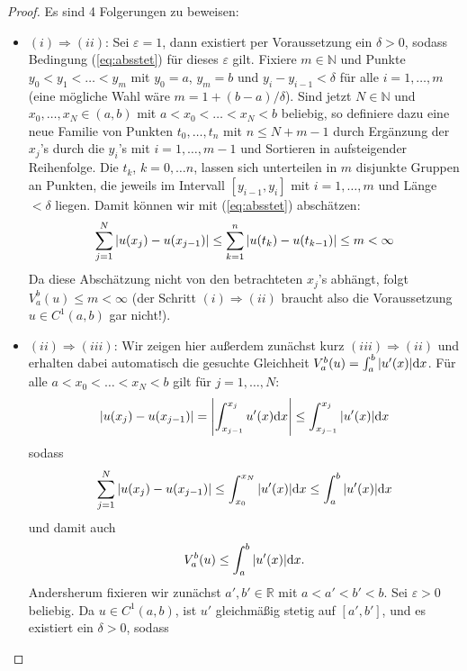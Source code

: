 \documentclass[twoside]{article}
\theoremstyle{definition}
\newcommand{\R}{\mathbb{R}}
\newcommand{\N}{\mathbb{N}}
\begin{document}
\begin{proof} Es sind 4 Folgerungen zu beweisen:
\begin{itemize}
\item $(i) \Rightarrow (ii)$: Sei $\varepsilon = 1$, dann existiert per Voraussetzung ein $\delta > 0$, sodass Bedingung (\ref{eq:absstet}) für dieses $\varepsilon$ gilt. Fixiere $m \in \N$ und Punkte $y_0 < y_1 < \dots < y_m$ mit $y_0 = a$, $y_m = b$ und $y_i - y_{i-1} < \delta$ für alle $i = 1, \dots, m$ (eine mögliche Wahl wäre $m = 1 + (b-a)/\delta$). Sind jetzt $N \in \N$ und $x_0, \dots, x_N \in (a,b)$ mit $a < x_0 < \dots < x_N < b$ beliebig, so definiere dazu eine neue Familie von Punkten $t_0, \dots, t_{n}$ mit $n \leq N+m-1$ durch Ergänzung der $x_j$'s durch die $y_i$'s mit $i = 1, \dots, m-1$ und Sortieren in aufsteigender Reihenfolge. Die $t_k$, $k = 0, \dots n$, lassen sich unterteilen in $m$ disjunkte Gruppen an Punkten, die jeweils im Intervall $[y_{i-1}, y_{i}]$ mit $i = 1, \dots, m$ und Länge $< \delta$ liegen. Damit können wir mit (\ref{eq:absstet}) abschätzen:
\begin{align*}
\sum_{j=1}^N \abs{u(x_j) - u(x_{j-1})} \leq \sum_{k=1}^n \abs{u(t_k) - u(t_{k-1})} \leq m < \infty
\end{align*}
Da diese Abschätzung nicht von den betrachteten $x_j$'s abhängt, folgt $V^b_a(u) \leq m < \infty$ (der Schritt $(i)\Rightarrow(ii)$ braucht also die Voraussetzung $u \in C^1(a,b)$ gar nicht!).
\item $(ii) \Rightarrow (iii)$: Wir zeigen hier außerdem zunächst kurz $(iii) \Rightarrow (ii)$ und erhalten dabei automatisch die gesuchte  Gleichheit $V^b_a(u) = \int_a^b \abs{u'(x)} \dd x$. Für alle $a < x_0 < \dots < x_N < b$ gilt für $j = 1, \dots, N$:
\begin{align*}
\abs{u(x_j)-u(x_{j-1})} = \abs{\int_{x_{j-1}}^{x_j} u'(x) \dd x} \leq \int_{x_{j-1}}^{x_j} \abs{u'(x)} \dd x
\end{align*}
sodass
\begin{align*}
\sum_{j=1}^N \abs{u(x_j)-u(x_{j-1})} \leq \int_{x_0}^{x_N} \abs{u'(x)} \dd x \leq \int_a^b \abs{u'(x)} \dd x
\end{align*}
und damit auch
\begin{align*}
V^b_a(u) \leq \int_a^b \abs{u'(x)} \dd x.
\end{align*}
Andersherum fixieren wir zunächst $a', b' \in \R$ mit $a < a' < b' < b$. Sei $\varepsilon > 0$ beliebig. Da $u \in C^1(a,b)$, ist $u'$ gleichmäßig stetig auf $[a',b']$, und es existiert ein $\delta > 0$, sodass 

\end{itemize}
\end{proof}
\end{document}
